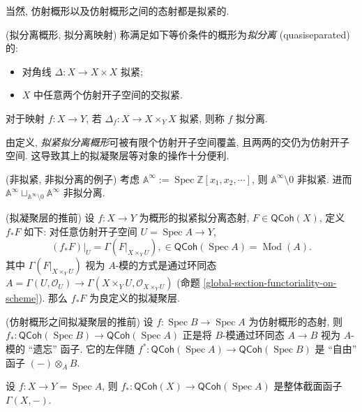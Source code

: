\documentclass{book}
\begin{document}
	当然, 仿射概形以及仿射概形之间的态射都是拟紧的.
	
	\begin{definition}
		{(拟分离概形, 拟分离映射)}
		称满足如下等价条件的概形为\emph{拟分离} (quasiseparated) 的:
		\begin{itemize}
			\item 对角线 $\Delta\colon X\to X\times X$ 拟紧;
			\item $X$ 中任意两个仿射开子空间的交拟紧.
		\end{itemize}
		对于映射 $f\colon X\to Y$, 若 $\Delta_f\colon X\to X\times_Y X$ 拟紧, 则称 $f$ 拟分离.
	\end{definition}
	
	由定义, \emph{拟紧拟分离概形}可被有限个仿射开子空间覆盖, 且两两的交仍为仿射开子空间. 这导致其上的拟凝聚层等对象的操作十分便利.
	
	\begin{example}
		{(非拟紧, 非拟分离的例子)}
		考虑 $\mathbb A^\infty :=\operatorname{Spec} \mathbb{Z}[x_1,x_2,\cdots]$,
		则 $\mathbb A^\infty \setminus 0$ 非拟紧. 进而
		$\mathbb A^\infty \sqcup_{\mathbb A^\infty\setminus 0}\mathbb A^\infty$ 非拟分离.
	\end{example}
	
	\begin{propdef}
		{(拟凝聚层的推前)}
		设 $f\colon X\to Y$ 为概形的拟紧拟分离态射, $F\in\mathsf{QCoh}(X)$, 定义 $f_*F$ 如下: 对任意仿射开子空间 $U=\operatorname{Spec} A\to Y$,
		$$
		(f_*F)|_U = \Gamma(F|_{X\times_Y U}),\in\mathsf{QCoh}(\operatorname{Spec} A)=\operatorname{Mod}(A).
		$$
		其中 $\Gamma(F|_{X\times_Y U})$ 视为 $A$-模的方式是通过环同态 $A=\Gamma(U,\mathcal O_U)\to\Gamma(X\times_Y U,\mathcal O_{X\times_Y U})$ (命题 \ref{global-section-functoriality-on-scheme}).
		那么 $f_*F$ 为良定义的拟凝聚层.
	\end{propdef}
	
	\begin{example}
		{(仿射概形之间拟凝聚层的推前)}
		设 $f\colon \operatorname{Spec} B \to \operatorname{Spec} A$ 为仿射概形的态射,
		则 $f_*\colon \mathsf{QCoh}(\operatorname{Spec} B)\to\mathsf{QCoh}(\operatorname{Spec} A)$ 正是将 $B$-模通过环同态 $A\to B$ 视为 $A$-模的 ``遗忘'' 函子. 它的左伴随 $f^*\colon \mathsf{QCoh}(\operatorname{Spec} A) \to\mathsf{QCoh}(\operatorname{Spec} B)$ 是 ``自由'' 函子 $(-)\otimes_A B$.
		
		设 $f\colon X \to Y=\operatorname{Spec} A$, 则 $f_*\colon \mathsf{QCoh}(X)\to\mathsf{QCoh}(\operatorname{Spec} A)$ 是整体截面函子 $\Gamma(X,-)$.
	\end{example}
	
\end{document}
